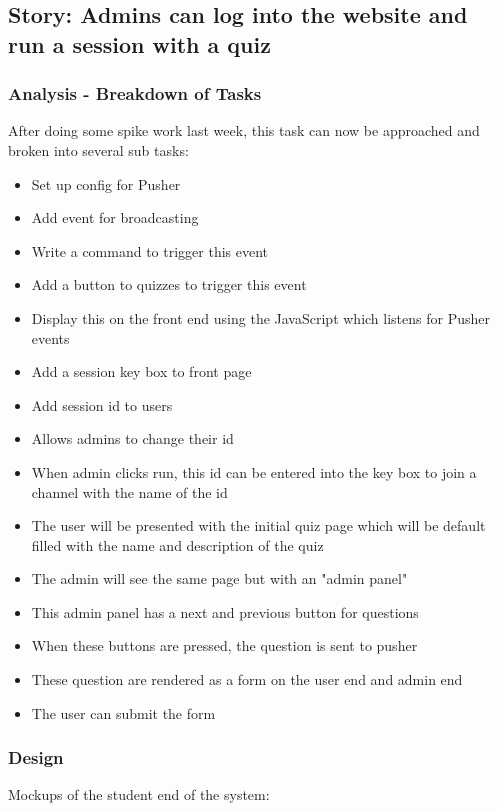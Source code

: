 \subsection{Story: Admins can log into the website and run a session with a quiz}
\subsubsection{Analysis - Breakdown of Tasks}
After doing some spike work last week, this task can now be approached and broken into several sub tasks:
\begin{itemize}
	\item Set up config for Pusher
	\item Add event for broadcasting
	\item Write a command to trigger this event
	\item Add a button to quizzes to trigger this event
	\item Display this on the front end using the JavaScript which listens for Pusher events
	\item Add a session key box to front page
	\item Add session id to users
	\item Allows admins to change their id
	\item When admin clicks run, this id can be entered into the key box to join a channel with the name of the id
	\item The user will be presented with the initial quiz page which will be default filled with the name and description of the quiz
	\item The admin will see the same page but with an "admin panel"
	\item This admin panel has a next and previous button for questions
	\item When these buttons are pressed, the question is sent to pusher
	\item These question are rendered as a form on the user end and admin end
	\item The user can submit the form
\end{itemize}
\subsubsection{Design}
Mockups of the student end of the system: 

